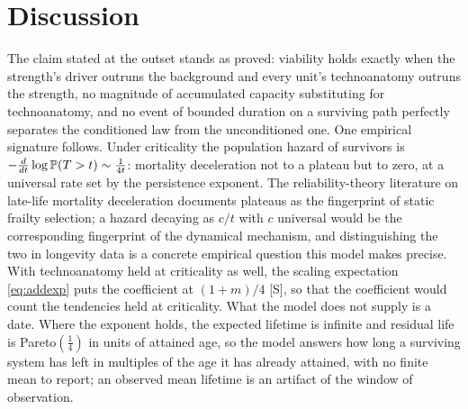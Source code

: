 \section{Discussion}\label{sec:discussion}

The claim stated at the outset stands as proved: viability holds
exactly when the strength's driver outruns the background and every
unit's technoanatomy outruns the strength, no magnitude of accumulated
capacity substituting for technoanatomy, and no event of bounded duration on a surviving
path perfectly separates the conditioned law from the unconditioned
one. One
empirical signature follows. Under criticality the
population hazard of survivors is $-\frac{d}{dt}\log\mathbb{P}(T>t)\sim
\frac{1}{4t}$: mortality deceleration not to a plateau but to zero, at
a universal rate set by the persistence exponent. The
reliability-theory literature on late-life mortality deceleration
\cite{GG01} documents plateaus as the fingerprint of static frailty
selection; a hazard decaying as $c/t$ with $c$ universal would be the
corresponding fingerprint of the dynamical mechanism, and
distinguishing the two in longevity data is a concrete empirical
question this model makes precise. With technoanatomy held at criticality
as well, the scaling expectation \eqref{eq:addexp} puts the coefficient at
$(1+m)/4$ [S], so that the coefficient would count the tendencies held at
criticality.
What the model does not supply is a date. Where the exponent holds, the
expected lifetime is infinite and residual life is Pareto$(\tfrac14)$ in
units of attained age, so the model answers how long a surviving system
has left in multiples of the age it has already attained, with no finite
mean to report; an observed mean lifetime is an artifact of the window
of observation.

